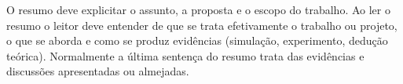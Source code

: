 
O resumo deve explicitar o assunto, a proposta e o escopo do trabalho. Ao ler o resumo o leitor deve entender de que se trata efetivamente o trabalho ou projeto, o que se aborda e como se produz evidências (simulação, experimento, dedução teórica). Normalmente a última sentença do resumo trata das evidências e discussões apresentadas ou almejadas. 

